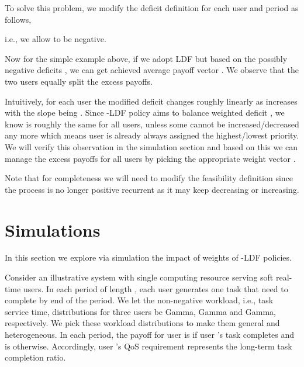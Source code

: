 \documentclass[prodmode,acmtompecs]{acmsmall}
\newcommand{\myComments}[1]{}
\newif\ifinfocom
\newif\ifextended
\newcommand{\infocomStart}{\ifinfocom \myComments{Infocom: }}
\newcommand{\extendedStart}{\ifextended  \myComments{Extended version: }}
\newcommand{\commentEnd}{\myComments{End}}
\newcommand{\add}[1]{#1}
\begin{document}
To solve this problem, we modify the deficit definition for each user  and period  as follows, 

i.e., we allow  to be negative. 

Now for the simple example above, if we adopt LDF but based on the possibly negative deficits , we can get achieved average payoff vector . We observe that the two users equally split the excess payoffs. 

Intuitively, for each user  the modified deficit  changes roughly linearly as  increases with the slope being . Since -LDF policy aims to balance weighted deficit , we know  is roughly the same for all users, unless some  cannot be increased/decreased any more which means user  is already always assigned the highest/lowest priority. We will verify this observation in the simulation section and based on this we can manage the excess payoffs for all users  by picking the appropriate weight vector . 
\commentEnd\fi

\add{
Note that for completeness we will need to modify the feasibility definition since the process  is no longer positive recurrent as it may keep decreasing or increasing. 
\infocomStart
Refer to the extended version of this paper \cite{EXT2} for details. 
\commentEnd\fi
\extendedStart
Now we call a payoff requirement vector  feasible if, under some user prioritization policy, for each user  the time-averaged payoff per period is at least . Formally, recall that  is the random payoff for user  in period . As the payoff requirement, each user  requires that

Note that this definition and Definition \ref{defn_feasibility_pr} are just two ways to define the feasibility. With the theorem in \cite{Bla56} we can show that for any user prioritization policy, the sets of feasible QoS requirements under these two different feasibility definitions differ by at most a boundary and thus are equivalent for practical purposes. Therefore, all the results we discuss in this paper hold under both feasibility definitions. 
\commentEnd\fi
}


\section{Simulations}
\label{sec_simulations}
In this section we explore via simulation the impact of weights of -LDF policies. 

Consider an illustrative system with single computing resource serving  soft real-time users. In each period of length , each user generates one task that need to complete by end of the period. We let the non-negative workload, i.e., task service time, distributions for three users be Gamma, Gamma and Gamma, respectively. We pick these workload distributions to make them general and heterogeneous. 
In each period, the payoff for user  is  if user 's task completes and is  otherwise. Accordingly, user 's QoS requirement  represents the long-term task completion ratio. 
\end{document}
